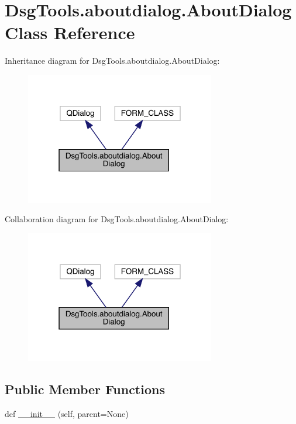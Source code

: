 \hypertarget{class_dsg_tools_1_1aboutdialog_1_1_about_dialog}{}\section{Dsg\+Tools.\+aboutdialog.\+About\+Dialog Class Reference}
\label{class_dsg_tools_1_1aboutdialog_1_1_about_dialog}


Inheritance diagram for Dsg\+Tools.\+aboutdialog.\+About\+Dialog\+:
\nopagebreak
\begin{figure}[H]
\begin{center}
\leavevmode
\includegraphics[width=235pt]{class_dsg_tools_1_1aboutdialog_1_1_about_dialog__inherit__graph}
\end{center}
\end{figure}


Collaboration diagram for Dsg\+Tools.\+aboutdialog.\+About\+Dialog\+:
\nopagebreak
\begin{figure}[H]
\begin{center}
\leavevmode
\includegraphics[width=235pt]{class_dsg_tools_1_1aboutdialog_1_1_about_dialog__coll__graph}
\end{center}
\end{figure}
\subsection*{Public Member Functions}
\begin{DoxyCompactItemize}
\item 
def \mbox{\hyperlink{class_dsg_tools_1_1aboutdialog_1_1_about_dialog_a4e4a7a7ca8dbc93c459b91e46c473f9d}{\+\_\+\+\_\+init\+\_\+\+\_\+}} (self, parent=None)
\end{DoxyCompactItemize}


